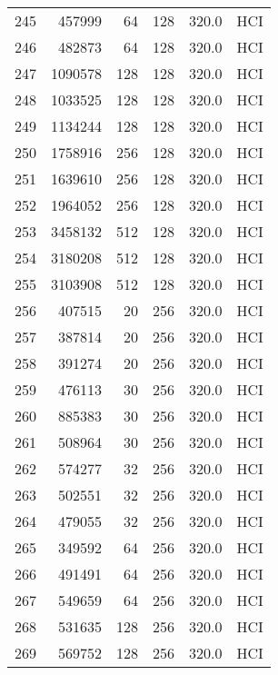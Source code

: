 \begin{longtable}{lrrrrl}
245 &    457999 &         64 &       128 &          320.0 &  HCI \\
246 &    482873 &         64 &       128 &          320.0 &  HCI \\
247 &   1090578 &        128 &       128 &          320.0 &  HCI \\
248 &   1033525 &        128 &       128 &          320.0 &  HCI \\
249 &   1134244 &        128 &       128 &          320.0 &  HCI \\
250 &   1758916 &        256 &       128 &          320.0 &  HCI \\
251 &   1639610 &        256 &       128 &          320.0 &  HCI \\
252 &   1964052 &        256 &       128 &          320.0 &  HCI \\
253 &   3458132 &        512 &       128 &          320.0 &  HCI \\
254 &   3180208 &        512 &       128 &          320.0 &  HCI \\
255 &   3103908 &        512 &       128 &          320.0 &  HCI \\
256 &    407515 &         20 &       256 &          320.0 &  HCI \\
257 &    387814 &         20 &       256 &          320.0 &  HCI \\
258 &    391274 &         20 &       256 &          320.0 &  HCI \\
259 &    476113 &         30 &       256 &          320.0 &  HCI \\
260 &    885383 &         30 &       256 &          320.0 &  HCI \\
261 &    508964 &         30 &       256 &          320.0 &  HCI \\
262 &    574277 &         32 &       256 &          320.0 &  HCI \\
263 &    502551 &         32 &       256 &          320.0 &  HCI \\
264 &    479055 &         32 &       256 &          320.0 &  HCI \\
265 &    349592 &         64 &       256 &          320.0 &  HCI \\
266 &    491491 &         64 &       256 &          320.0 &  HCI \\
267 &    549659 &         64 &       256 &          320.0 &  HCI \\
268 &    531635 &        128 &       256 &          320.0 &  HCI \\
269 &    569752 &        128 &       256 &          320.0 &  HCI \\

\end{longtable}
